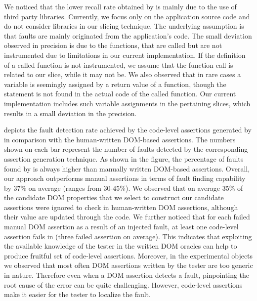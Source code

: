 We noticed that the lower recall rate obtained by \tool is mainly due to the use of third party libraries. Currently, we focus only on the application source code and do not consider libraries in our slicing technique. The underlying assumption is that faults are mainly originated from the application's code. The small deviation observed in precision is due to the functions, that are called but are not instrumented due to limitations in our current implementation. If the definition of a called function is not instrumented, we assume that the function call is related to our slice, while it may not be. We also observed that in rare cases a variable is seemingly assigned by a return value of a function, though the  statement is not found in the actual code of the called function. Our current implementation includes such variable assignments in the pertaining slices, which results in a small deviation in the precision.  

 depicts the fault detection rate achieved by the code-level assertions generated by \tool in comparison with the human-written DOM-based assertions. The numbers shown on each bar represent the number of faults detected by the corresponding assertion generation technique. As shown in the figure, the percentage of faults found by \tool is always higher than manually written DOM-based assertions. Overall, our approach outperforms manual assertions in terms of fault finding capability by 37\% on average (ranges from 30-45\%). We observed that on average 35\% of the candidate DOM properties that we select to construct our candidate assertions were ignored to check in human-written DOM assertions, although their value are updated through the \javascript code.
We further noticed that for each failed manual DOM assertion as a result of an injected fault, at least one code-level assertion fails in \tool (three failed assertion on average). This indicates that exploiting the available knowledge of the tester in the written DOM oracles can help to produce fruitful set of code-level assertions. Moreover, in the experimental objects we observed that most often DOM assertions written by the tester are too generic in nature. Therefore even when a DOM assertion detects a \javascript fault, pinpointing the root cause of the error can be quite challenging. However, code-level assertions make it easier for the tester to localize the fault.  
